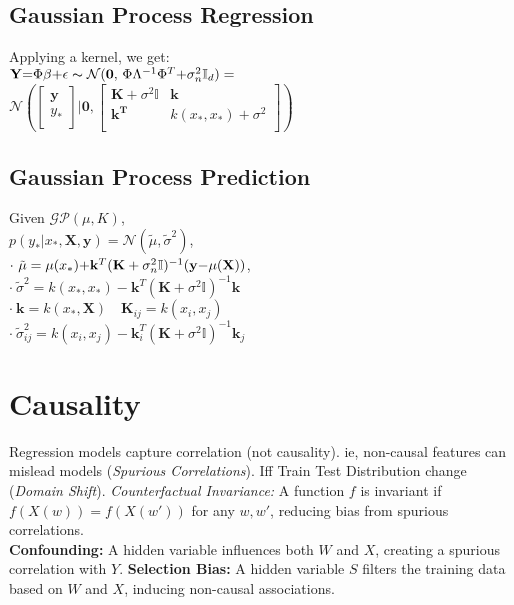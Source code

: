 \subsection*{Gaussian Process Regression}
Applying a kernel, we get: \\
$\mathbf{Y} {=} \Phi \mathbb{\beta} {+} \mathbb{\epsilon} \thicksim \mathcal{N}(\mathbf{0},\,\Phi \Lambda^{-1}\Phi^T {+} \sigma_n^2\mathbb{I}_{d}) = $
$\mathcal{N}(\begin{bmatrix}
\mathbf{y}\\
y_*\\
\end{bmatrix}|\mathbf{0},\begin{bmatrix}
    \mathbf{K}+\sigma^2\mathbb{I} & \mathbf{k} \\
    \mathbf{k^T} & k(x_*,x_*) + \sigma^2\\
\end{bmatrix})$\\

\subsection*{Gaussian Process Prediction}
Given $\mathcal{GP}(\mu, K)$, \\
$p(y_*|x_*,\mathbf{X},\mathbf{y}) = \mathcal{N}(\tilde \mu, \tilde \sigma^2)$,\\
$\cdot \ \tilde\mu = \mu(x_*) {+} \mathbf{k}^T(\mathbf{K}+\sigma_n^2\mathbb{I})^{-1}(\mathbf{y} {-} \mu(\mathbf{X}))$,\\
$\cdot \ \tilde\sigma^2 = k(x_*,x_*) - \mathbf{k}^T(\mathbf{K}+\sigma^2\mathbb{I})^{-1}\mathbf{k}$\\
$\cdot \ \mathbf{k}=k(x_*,\mathbf{X})\quad \mathbf{K}_{ij}=k(x_i,x_j)$ \\
$\cdot \ \tilde\sigma^2_{ij} = k(x_i,x_j) - \mathbf{k}^T_i(\mathbf{K}+\sigma^2\mathbb{I})^{-1}\mathbf{k}_j$\\

\section*{Causality}
Regression models capture correlation (not causality). ie, non-causal features can mislead models (\textit{Spurious Correlations}). Iff Train Test Distribution change (\textit{Domain Shift}).
\textit{Counterfactual Invariance:} A function $f$ is invariant if $f(X(w)) = f(X(w'))$ for any $w, w'$, reducing bias from spurious correlations. \\
\textbf{Confounding:} A hidden variable influences both $W$ and $X$, creating a spurious correlation with $Y$.
\textbf{Selection Bias:} A hidden variable $S$ filters the training data based on $W$ and $X$, inducing non-causal associations.

